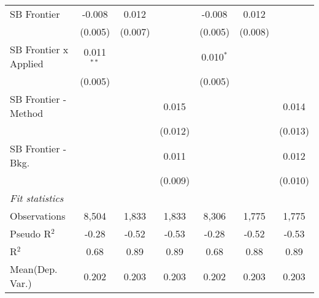\begin{tabular}{lcccccc}
   SB Frontier                  & -0.008         & 0.012        &              & -0.008         & 0.012        &   \\   
                                & (0.005)        & (0.007)      &              & (0.005)        & (0.008)      &   \\   
   SB Frontier x Applied        & 0.011$^{**}$   &              &              & 0.010$^{*}$    &              &   \\   
                                & (0.005)        &              &              & (0.005)        &              &   \\   
   SB Frontier - Method         &                &              & 0.015        &                &              & 0.014\\   
                                &                &              & (0.012)      &                &              & (0.013)\\   
   SB Frontier - Bkg.           &                &              & 0.011        &                &              & 0.012\\   
                                &                &              & (0.009)      &                &              & (0.010)\\   
   \midrule
   \emph{Fit statistics}\\
   Observations                 & 8,504          & 1,833        & 1,833        & 8,306          & 1,775        & 1,775\\  
   Pseudo R$^2$                 & -0.28          & -0.52        & -0.53        & -0.28          & -0.52        & -0.53\\  
   R$^2$                        & 0.68           & 0.89         & 0.89         & 0.68           & 0.88         & 0.89\\  
Mean(Dep. Var.) & 0.202 & 0.203 & 0.203 & 0.202 & 0.203 & 0.203 \\
   

\end{tabular}

